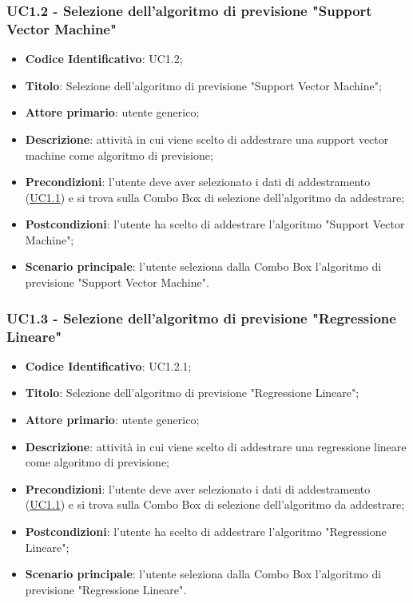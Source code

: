 		\label{par:UC1.2}
		\subsubsection{UC1.2 - Selezione dell'algoritmo di previsione "Support Vector Machine"}
		\begin{itemize}
			\item\textbf{Codice Identificativo}: UC1.2;
			\item\textbf{Titolo}: Selezione dell'algoritmo di previsione "Support Vector Machine";
			\item\textbf{Attore primario}: utente generico;
			\item\textbf{Descrizione}: attività in cui viene scelto di addestrare una support vector machine come algoritmo di previsione;
			\item\textbf{Precondizioni}: l'utente deve aver selezionato i dati di addestramento (\hyperref[par:UC1.1]{UC1.1}) e si trova sulla Combo Box di selezione dell'algoritmo da addestrare;
			\item\textbf{Postcondizioni}: l'utente ha scelto di addestrare l'algoritmo "Support Vector Machine";
			\item\textbf{Scenario principale}: l'utente seleziona dalla Combo Box l'algoritmo di previsione "Support Vector Machine".
		\end{itemize}
		
		\label{par:UC1.3}
		\subsubsection{UC1.3 - Selezione dell'algoritmo di previsione "Regressione Lineare"}
		\begin{itemize}
			\item\textbf{Codice Identificativo}: UC1.2.1;
			\item\textbf{Titolo}: Selezione dell'algoritmo di previsione "Regressione Lineare";
			\item\textbf{Attore primario}: utente generico;
			\item\textbf{Descrizione}: attività in cui viene scelto di addestrare una regressione lineare come algoritmo di previsione;
			\item\textbf{Precondizioni}: l'utente deve aver selezionato i dati di addestramento (\hyperref[par:UC1.1]{UC1.1}) e si trova sulla Combo Box di selezione dell'algoritmo da addestrare;
			\item\textbf{Postcondizioni}: l'utente ha scelto di addestrare l'algoritmo "Regressione Lineare";
			\item\textbf{Scenario principale}: l'utente seleziona dalla Combo Box l'algoritmo di previsione "Regressione Lineare".		
		\end{itemize}
		
